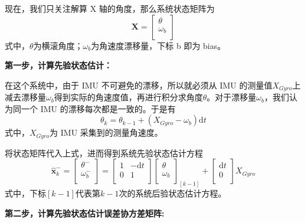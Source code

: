 现在，我们只关注解算 X 轴的角度，那么系统状态矩阵为
$$
\boldsymbol{X}=\left[ \begin{array}{c}
	\theta\\
	\omega _b\\
\end{array} \right] 
$$
式中，$\theta$为横滚角度；$\omega _b$为角速度漂移量，下标 b 即为 bias。  

\textbf{第一步，计算先验状态估计：}

在这个系统中，由于 IMU 不可避免的漂移，所以就必须从 IMU 的测量值$X_{Gyro}$上减去漂移量$\omega _b$得到实际的角速度值，再进行积分求角度$\theta$。对于漂移量$\omega _b$，我们认为同一个 IMU 的漂移每次都是一致的。于是有
$$
\theta _k =\theta _{k-1} +\left( X_{Gyro}-\omega _b \right) \text{d}t
$$
式中，$X_{Gyro}$为 IMU 采集到的测量角速度。

将状态矩阵代入上式，进而得到系统先验状态估计方程
$$
\boldsymbol{\hat{x}}_{k}^{-}=\left[ \begin{array}{c}
	\theta ^{-}\\
	\omega _{b}^{-}\\
\end{array} \right] =\left[ \begin{matrix}
	1&		-\text{d}t\\
	0&		1\\
\end{matrix} \right] \left[ \begin{array}{c}
	\theta\\
	\omega _b\\
\end{array} \right] _{\left[ k-1 \right]}+\left[ \begin{array}{c}
	\text{d}t\\
	0\\
\end{array} \right]X_{Gyro}
$$
式中，下标$\left[ k-1 \right]$代表第$k-1$次的系统后验状态估计方程。

\textbf{第二步，计算先验状态估计误差协方差矩阵:}

